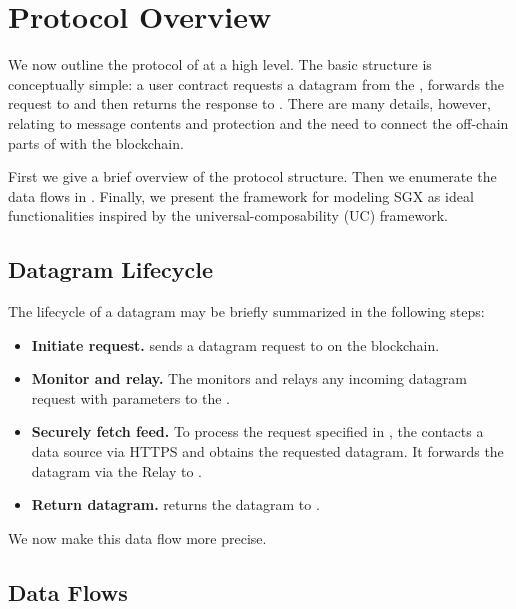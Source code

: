 

\section{\tc Protocol Overview}
\label{sec:protocols}
We now outline the protocol of \tc at a high level.
The basic structure is conceptually simple:
a user contract \reqcont requests a datagram from the \tcontract \tcont, \tcont forwards the request to \engine and then returns the response to \reqcont.
There are many details, however, relating to message contents and protection and the need to connect the off-chain parts of \tc with the blockchain.

First we give a brief overview of the protocol structure.
Then we enumerate the data flows in \tc.
Finally, we present the framework for modeling SGX as ideal functionalities inspired by the universal-composability (UC) framework.

\subsection{Datagram Lifecycle}

The lifecycle of a datagram may be briefly summarized in the following steps:

\vspace{-1ex}
\begin{itemize}
  \setlength{\itemsep}{2pt}
  \setlength{\parskip}{0pt}
  \setlength{\parsep}{0pt}
\item {\bf Initiate request.} \reqcont sends a datagram request to \tcont on the blockchain.

\item {\bf Monitor and relay.} The \medname monitors \tcont and relays any incoming datagram request with parameters \dgform to the \encname.

\item {\bf Securely fetch feed.} To process the request specified in \dgform, the \encname contacts a data source via HTTPS and obtains the requested datagram. It forwards the datagram via the Relay to \tcont.

\item {\bf Return datagram.} \tcont returns the datagram to \reqcont.
\end{itemize}
\vspace{-1ex}

\noindent We now make this data flow more precise. 

\subsection{Data Flows}
\label{sec:protocol-data-flows}

